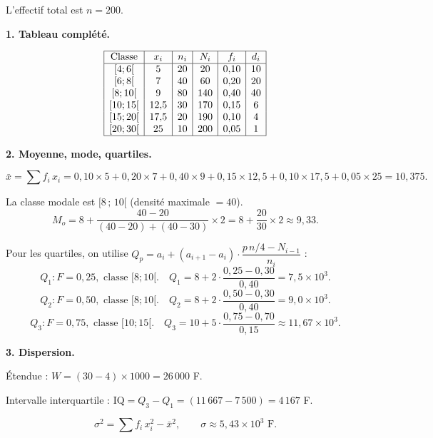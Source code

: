 \documentclass[12pt,a4paper]{article}
\begin{document}
\begin{boitecorrige}
L'effectif total est $n = 200$.

\textbf{1. Tableau complété.}

\[
\begin{array}{|c|c|c|c|c|c|}
\hline
\text{Classe} & x_i & n_i & N_i & f_i & d_i \\
\hline
{[4;6[}   & 5  & 20  & 20  & 0{,}10 & 10 \\
{[6;8[}   & 7  & 40  & 60  & 0{,}20 & 20 \\
{[8;10[}  & 9  & 80  & 140 & 0{,}40 & 40 \\
{[10;15[} & 12{,}5 & 30 & 170 & 0{,}15 & 6 \\
{[15;20[} & 17{,}5 & 20 & 190 & 0{,}10 & 4 \\
{[20;30[} & 25 & 10  & 200 & 0{,}05 & 1 \\
\hline
\end{array}
\]

\textbf{2. Moyenne, mode, quartiles.}

\[
\bar{x} = \sum f_i\,x_i = 0{,}10\times5 + 0{,}20\times7 + 0{,}40\times9 + 0{,}15\times12{,}5 + 0{,}10\times17{,}5 + 0{,}05\times25 = 10{,}375.
\]

La classe modale est $[8\,;\,10[$ (densité maximale $= 40$).
\[
M_o = 8 + \frac{40-20}{(40-20)+(40-30)} \times 2 = 8 + \frac{20}{30} \times 2 \approx 9{,}33.
\]

Pour les quartiles, on utilise $Q_p = a_i + (a_{i+1}-a_i)\cdot\dfrac{p\,n/4 - N_{i-1}}{n_i}$ :
\[
Q_1 : F = 0{,}25,\text{ classe } [8;10[. \quad Q_1 = 8 + 2 \cdot \frac{0{,}25 - 0{,}30}{0{,}40} = 7{,}5 \times 10^3.
\]
\[
Q_2 : F = 0{,}50,\text{ classe } [8;10[. \quad Q_2 = 8 + 2 \cdot \frac{0{,}50 - 0{,}30}{0{,}40} = 9{,}0 \times 10^3.
\]
\[
Q_3 : F = 0{,}75,\text{ classe } [10;15[. \quad Q_3 = 10 + 5 \cdot \frac{0{,}75 - 0{,}70}{0{,}15} \approx 11{,}67 \times 10^3.
\]

\textbf{3. Dispersion.}

Étendue : $W = (30-4) \times 1000 = 26\,000$ F.

Intervalle interquartile : $\mathrm{IQ} = Q_3 - Q_1 = (11\,667 - 7\,500) = 4\,167$ F.

\[
\sigma^2 = \sum f_i\,x_i^2 - \bar{x}^2, \qquad \sigma \approx 5{,}43 \times 10^3 \text{ F}.
\]
\end{boitecorrige}
\end{document}
